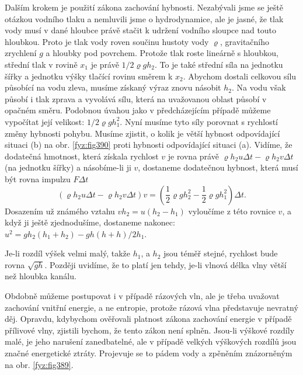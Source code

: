 {  Dalším krokem je použití zákona zachování hybnosti. Nezabývali jsme se ještě otázkou vodního 
  tlaku a nemluvili jsme o hydrodynamice, ale je jasné, že tlak vody musí v dané hloubce právě 
  stačit k udržení vodního sloupce nad touto hloubkou. Proto je tlak vody roven součinu hustoty 
  vody \(\varrho\), gravitačního zrychlení \(g\) a hloubky pod povrchem. Protože tlak roste 
  lineárně s hloubkou, střední tlak v rovině \(x_1\) je právě \(1/2\varrho gh_2\). To je také 
  střední síla na jednotku šířky a jednotku výšky tlačící rovinu směrem k \(x_2\). Abychom dostali 
  celkovou sílu působící na vodu zleva, musíme získaný výraz znovu násobit \(h_2\). Na vodu však 
  působí i tlak zprava a vyvolává sílu, která na uvažovanou oblast působí v opačném směru. Podobnou 
  úvahou jako v předcházejícím případě můžeme vypočítat její velikost: \(1/2\varrho gh_1^2\). Nyní 
  musíme tyto síly porovnat s rychlostí změny hybnosti pohybu. Musíme zjistit, o kolik je větší 
  hybnost odpovídající situaci (b) na obr. \ref{fyz:fig390} proti hybnosti odpovídající situaci 
  (a). Vidíme, že dodatečná hmotnost, která získala rychlost \(v\) je rovna právě \(\varrho 
  h_2u\Delta t - \varrho h_2v\Delta t\) (na jednotku šířky) a násobíme-li ji \(v\), dostaneme 
  dodatečnou hybnost, která musí být rovna impulzu \(F\Delta t\)
  \begin{equation*}
    (\varrho h_2u\Delta t - \varrho h_2v\Delta t) v
      = \left(\dfrac{1}{2}\varrho g h_2^2 - \dfrac{1}{2}\varrho g h_1^2\right)\Delta t.
  \end{equation*}
  Dosazením už známého vztahu \(vh_2 = u(h_2 - h_1)\) vyloučíme z této rovnice \(v\), a když ji 
  ještě zjednodušíme, dostaneme nakonec: \(u^2 = gh_2(h_1 + h_2)-gh (h+h)/2 h_1\).
  
  Je-li rozdíl výšek velmi malý, takže \(h_1\), a \(h_2\) jsou téměř stejné, rychlost bude rovna 
  \(\sqrt{gh}\). Později uvidíme, že to platí jen tehdy, je-li vlnová délka vlny větší než hloubka 
  kanálu.
  
  Obdobně můžeme postupovat i v případě rázových vln, ale je třeba uvažovat zachování vnitřní 
  energie, a ne entropie, protože rázová vlna představuje nevratný děj. Opravdu, kdybychom 
  ověřovali platnost zákona zachování energie v případě přílivové vlny, zjistili bychom, že tento 
  zákon není splněn. Jsou-li výškové rozdíly malé, je jeho narušení zanedbatelné, ale v případě 
  velkých výškových rozdílů jsou značné energetické ztráty. Projevuje se to pádem vody a zpěněním 
  znázorněným na obr. \ref{fyz:fig389}.
  
}
